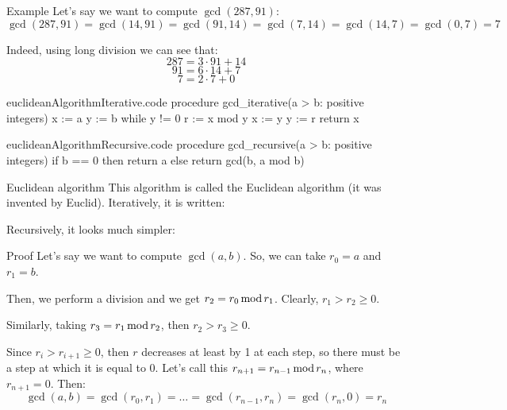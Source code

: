 \documentclass[a4paper]{article}
\begin{document}
\begin{parag}{Example}
    Let's say we want to compute $\gcd\left(287, 91\right)$: 
    \[\gcd\left(287, 91\right) = \gcd\left(14, 91\right) = \gcd\left(91, 14\right) = \gcd\left(7, 14\right) = \gcd\left(14, 7\right) = \gcd\left(0, 7\right) = 7\]
    
    Indeed, using long division we can see that: 
    \[287 = 3\cdot 91 + 14\]
    \[91 = 6\cdot 14 + 7\]
    \[7 = 2\cdot 7 + 0\]
    
\end{parag}

\begin{filecontents*}[overwrite]{euclideanAlgorithmIterative.code}
procedure gcd_iterative(a > b: positive integers)
    x := a
    y := b
    while y != 0
        r := x mod y
        x := y
        y := r
    return x
\end{filecontents*}

\begin{filecontents*}[overwrite]{euclideanAlgorithmRecursive.code}
procedure gcd_recursive(a > b: positive integers)
    if b == 0 then return a
    else return gcd(b, a mod b)
\end{filecontents*}


\begin{parag}{Euclidean algorithm}
    This algorithm is called the Euclidean algorithm (it was invented by Euclid). Iteratively, it is written:
    
    Recursively, it looks much simpler:

    \begin{subparag}{Proof}
        Let's say we want to compute $\gcd\left(a, b\right)$. So, we can take $r_0 = a$ and $r_1 = b$. 

        Then, we perform a division and we get $r_2 = r_0 \operatorname{mod} r_1$. Clearly, $r_1 > r_2 \geq 0$.

        Similarly, taking $r_3 = r_1 \operatorname{mod} r_2$, then $r_2 > r_3 \geq 0$.

        Since $r_i > r_{i+1} \geq 0$, then $r$ decreases at least by 1 at each step, so there must be a step at which it is equal to 0. Let's call this $r_{n+1} = r_{n-1} \operatorname{mod} r_n$, where $r_{n+1} = 0$. Then: 
        \[\gcd\left(a, b\right) = \gcd\left(r_0, r_1\right) = \ldots = \gcd\left(r_{n-1}, r_{n}\right) = \gcd\left(r_n, 0\right) = r_n\]
    \end{subparag}
\end{parag}
\end{document}
